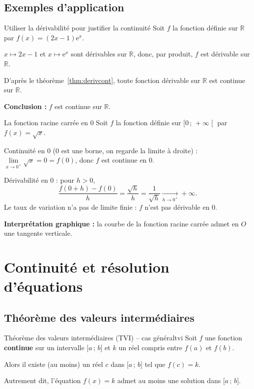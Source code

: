\documentclass[11pt,a4paper]{article}
\newcommand{\R}{\mathbb{R}}
\newcommand{\e}{\mathrm{e}}
\newcommand{\intff}[2]{\mathopen{[}#1\,;\,#2\mathclose{]}}
\newcommand{\intfo}[2]{\mathopen{[}#1\,;\,#2\mathclose{[}}
\newcommand{\limd}[2]{\lim\limits_{x\to #1^+}#2}
\begin{document}
\subsection{Exemples d'application}

\begin{exemple}{Utiliser la dérivabilité pour justifier la continuité}{}
Soit $f$ la fonction définie sur $\R$ par $f(x)=(2x-1)\e^{x}$.
\begin{etapes}
  \item $x\mapsto 2x-1$ et $x\mapsto\e^x$ sont dérivables sur $\R$, donc, par
        produit, $f$ est dérivable sur $\R$.
  \item D'après le théorème~\ref{thm:derivcont}, toute fonction dérivable sur $\R$
        est continue sur $\R$.
\end{etapes}
\textbf{Conclusion :} $f$ est continue sur $\R$.
\end{exemple}

\begin{exemple}{La fonction racine carrée en $0$}{}
Soit $f$ la fonction définie sur $\intfo{0}{+\infty}$ par $f(x)=\sqrt{x}$.
\begin{etapes}
  \item Continuité en $0$ ($0$ est une borne, on regarde la limite à droite) :
        $\limd{0}{\sqrt{x}}=0=f(0)$, donc $f$ est continue en $0$.
  \item Dérivabilité en $0$ : pour $h>0$,
  \[
    \frac{f(0+h)-f(0)}{h}=\frac{\sqrt{h}}{h}=\frac{1}{\sqrt{h}}
    \xrightarrow[h\to 0^+]{}+\infty .
  \]
  Le taux de variation n'a pas de limite finie : $f$ n'est pas dérivable en $0$.
\end{etapes}
\textbf{Interprétation graphique :} la courbe de la fonction racine carrée admet en
$O$ une tangente verticale.
\end{exemple}

\section{Continuité et résolution d'équations}

\subsection{Théorème des valeurs intermédiaires}

\begin{theoreme}{Théorème des valeurs intermédiaires (TVI) -- cas général}{tvi}
Soit $f$ une fonction \textbf{continue} sur un intervalle $\intff{a}{b}$ et $k$
un réel compris entre $f(a)$ et $f(b)$.

Alors il existe (au moins) un réel $c$ dans $\intff{a}{b}$ tel que $f(c)=k$.

Autrement dit, l'équation $f(x)=k$ admet au moins une solution dans $\intff{a}{b}$.
\end{theoreme}
\end{document}
